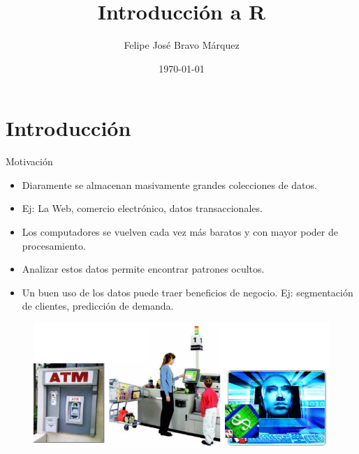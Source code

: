 \documentclass[handout]{beamer}
\title{Introducción a R}
\author[Felipe Bravo Márquez]{\footnotesize
 \textcolor[rgb]{0.00,0.00,1.00}{Felipe José Bravo Márquez}}
\date{ \today }
\begin{document}
\begin{frame}
\titlepage


\end{frame}




\section{Introducción}

\begin{frame}{Motivación}

\scriptsize{
\begin{itemize}
 \item Diaramente se almacenan masivamente grandes colecciones de datos. 
 \item Ej: La Web, comercio electrónico, datos transaccionales.
 \item Los computadores se vuelven cada vez más baratos y con mayor poder de procesamiento.
 \item Analizar estos datos permite encontrar patrones ocultos. 
 \item Un buen uso de los datos puede traer beneficios de negocio. Ej: segmentación de clientes, predicción de demanda.
\end{itemize}

}
\begin{figure}[h!]
	\centering
	\includegraphics[scale=0.5]{imagenes/supermercado.png}
\end{figure}
 
\end{frame}
\end{document}
